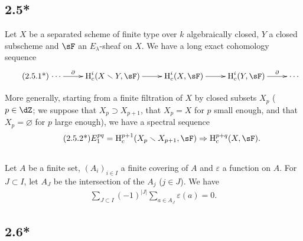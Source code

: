 \subsection*{2.5*}\label{VI:2-5*}

Let $X$ be a separated scheme of finite type over $k$ algebraically closed,
$Y$ a closed subscheme and $\sF$ an $E_\lambda$-sheaf on $X$. We have
a long exact cohomology sequence 
\begin{align*}\tag{2.5.1*}\label{VI:eq:2-5-1*}
\xymatrix{
  \cdots \ar[r]^-\partial 
    & \h_c^i(X\setminus Y,\sF) \ar[r] 
    & \h_c^i(X,\sF) \ar[r] 
    & \h_c^i(Y,\sF) \ar[r]^-\partial 
    & \cdots 
}
\end{align*}

More generally, starting from a finite filtration of $X$ by closed
subsets $X_p$ ($p\in \dZ$; we suppose that $X_p\supset X_{p+1}$, that $X_p=X$
for $p$ small enough, and that $X_p=\varnothing$ for $p$ large enough), we have a
spectral sequence 
\begin{align*}\tag{2.5.2*}\label{VI:eq:2-5-2*}
  E_1^{p q} = \h_c^{p+1}(X_p\setminus X_{p+1},\sF) \Rightarrow \h_c^{p+q}(X,\sF) \text{.}
\end{align*}





\subsection{}\label{VI:2-6}

Let $A$ be a finite set, $(A_i)_{i\in I}$ a finite covering of $A$ and
$\varepsilon$ a function on $A$. For $J\subset I$, let $A_J$ be
the intersection of the $A_j$ ($j\in J$). We have 
\begin{align*}\tag{2.6.1}\label{VI:eq:2-6-1}
  \sum_{J\subset I} (-1)^{|J|} \sum_{a\in A_J} \varepsilon(a) = 0 \text{.}
\end{align*}





\subsection*{2.6*}\label{VI:2-6*}

